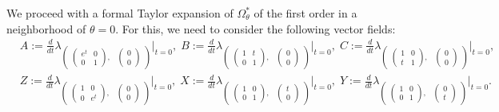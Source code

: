 \documentclass[a4paper,11pt,reqno]{amsart}
\numberwithin{equation}{section}
\theoremstyle{remark}
\theoremstyle{definition}
\begin{document}
We proceed with a formal Taylor expansion of $\Omega^*_\theta$  of the first order  in a neighborhood of  $\theta=0$. For this, we need to consider the following vector fields:
\begin{align*}
&A:=\frac d{dt} \lambda_{\begin{pmatrix} \begin{pmatrix}e^t&0\\0&1\end{pmatrix},&\!\!\!\!\begin{pmatrix}0\\0\end{pmatrix}\end{pmatrix}}\Bigg|_{t=0},\;
B:=\frac d{dt} \lambda_{\begin{pmatrix} \begin{pmatrix}1&t\\0&1\end{pmatrix},&\!\!\!\!\begin{pmatrix}0\\0\end{pmatrix}\end{pmatrix}}\Bigg|_{t=0},\;
C:=\frac d{dt} \lambda_{\begin{pmatrix} \begin{pmatrix}1&0\\t&1\end{pmatrix},&\!\!\!\!\begin{pmatrix}0\\0\end{pmatrix}\end{pmatrix}}\Bigg|_{t=0},\\
&Z:=\frac d{dt} \lambda_{\begin{pmatrix} \begin{pmatrix}1&0\\0& e^t\end{pmatrix},&\!\!\!\!\begin{pmatrix}0\\0\end{pmatrix}\end{pmatrix}}\Bigg|_{t=0},\;
X:=\frac d{dt} \lambda_{\begin{pmatrix} \begin{pmatrix}1&0\\0&1\end{pmatrix},&\!\!\!\!\begin{pmatrix}t\\0\end{pmatrix}\end{pmatrix}}\Bigg|_{t=0},\;
Y:=\frac d{dt} \lambda_{\begin{pmatrix} \begin{pmatrix}1&0\\0&1\end{pmatrix},&\!\!\!\!\begin{pmatrix}0\\ t\end{pmatrix}\end{pmatrix}}\Bigg|_{t=0}.
\end{align*}
\end{document}
